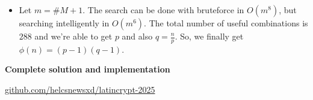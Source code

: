 \documentclass[a0paper,portrait]{baposter}
\begin{document}
\begin{poster}
{\begin{itemize}
      \vspace{-0.8em}
    \item Let $m = \#M + 1$. The search can be done with bruteforce in $O(m^8)$,
      but searching intelligently in $O(m^6)$.
      The total number of useful combinations is $288$ and we're able 
      to get $p$ and also $q = \frac{n}{p}$.
      So, we finally get $\phi(n) = (p-1)(q-1)$.
  \end{itemize}

  \vspace{-0.5em}
  \textbf{Complete solution and implementation}
  
  \vspace{-0.5em}
  \begin{center}
    \raisebox{-0.3em}{\Large\faGithub}\quad \url{github.com/helcsnewsxd/latincrypt-2025}
  \end{center}
}

\end{poster}
\end{document}
